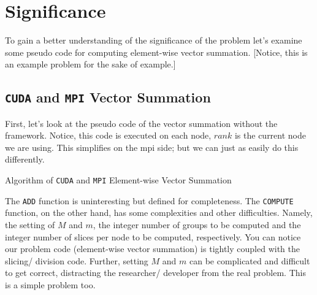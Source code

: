 \section{Significance}

To gain a better understanding of the significance of the problem let's examine
some pseudo code for computing element-wise vector summation. [Notice, this is
an example problem for the sake of example.]

\subsection{\texttt{CUDA} and \texttt{MPI} Vector Summation}

First, let's look at the pseudo code of the vector summation without the
framework. Notice, this code is executed on each node, $rank$ is the current
node we are using. This simplifies  on the \gls{mpi} side; but we can just as
easily do this differently.

\begin{algorithm}
\begin{algorithmic}
\EndFunction{}
    \EndFor{}
\EndFunction{}
\end{algorithmic}
\caption{Algorithm of \texttt{CUDA} and \texttt{MPI} Element-wise Vector
Summation}
\label{alg:cuda_mpi_vsum}
\end{algorithm}

The \texttt{ADD} function is uninteresting but defined for completeness. The
\texttt{COMPUTE} function, on the other hand, has some complexities and other
difficulties. Namely, the setting of $M$ and $m$, the integer number of groups
to be computed and the integer number of slices per node to be computed,
respectively. You can notice our problem code (element-wise vector summation)
is tightly coupled with the slicing/ division code. Further, setting $M$ and
$m$ can be complicated and difficult to get correct, distracting the
researcher/ developer from the real problem. This is a simple problem too.

